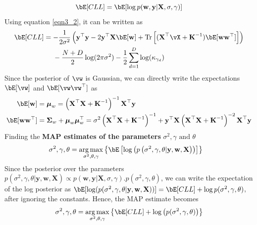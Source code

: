 \documentclass[a4paper,11pt]{article}
\begin{document}
\begin{pmisolution}
\begin{equation*}
    \bE[CLL] = \bE[\log p(\textbf{w}, \textbf{y}|\textbf{X}, \sigma, \gamma)]
\end{equation*}
Using equation \ref{eqn3_2}, it can be written as
\begin{equation}
\label{eqn3_3}
    \begin{split}
    \bE[CLL] &= -\frac{1}{2\sigma^2} \left(\textbf{y}^\top\textbf{y} - 2\textbf{y}^\top\textbf{X}\bE[\textbf{w}] + \text{Tr}\left[(\textbf{X}^\top\vX +\textbf{K}^{-1})\bE[\textbf{ww}^\top]\right] \right) 
    \\& ~~~~ - \frac{N+D}{2} \log (2\pi\sigma^2) - \frac{1}{2} \sum_{d=1}^D  \log (\kappa_{\gamma_d})
    \end{split}
\end{equation}
Since the posterior of $\vw$ is Gaussian, we can directly write the expectations $\bE[\vw]$ and $\bE[\vw\vw^\top]$ as
\begin{equation}
\label{eqn3_4}
\begin{split}
    \bE[\textbf{w}] &= \boldsymbol{\mu}_w = \left(\textbf{X}^\top\textbf{X} + \textbf{K}^{-1}\right) ^{-1}\textbf{X}^\top\textbf{y}
    \\ \bE[\textbf{ww}^\top] &= \boldsymbol{\Sigma}_w + \boldsymbol{\mu}_w\boldsymbol{\mu}_w^\top = \sigma^2\left(\textbf{X}^\top\textbf{X} + \textbf{K}^{-1}\right)^{-1} + \textbf{y}^\top\textbf{X}\left(\textbf{X}^\top\textbf{X} + \textbf{K}^{-1}\right)^{-2}\textbf{X}^\top\textbf{y} 
\end{split}
\end{equation}
\newpage
\noindent Finding the \textbf{MAP estimates of the parameters} $\sigma^2, \gamma \text{ and } \theta$
\begin{align}
    \sigma^2, \gamma, \theta &= \argmax_{\sigma^2, \theta, \gamma} \left\{ \bE\left[\log \left(p\left(\sigma^2, \gamma, \theta|\textbf{y}, \textbf{w}, \textbf{X}\right)\right)\right] \right\}
    \nonumber
\end{align}
Since the posterior over the parameters $p(\sigma^2, \gamma, \theta|\textbf{y}, \textbf{w}, \textbf{X}) \propto p(\textbf{w}, \textbf{y}|\textbf{X}, \sigma, \gamma).p(\sigma^2, \gamma, \theta)$, we can write the expectation of the log posterior as $\bE[\log (p(\sigma^2, \gamma, \theta|\textbf{y}, \textbf{w}, \textbf{X}))] = \bE[CLL] + \log p(\sigma^2, \gamma, \theta)$, after ignoring the constants. Hence, the MAP estimate becomes
\begin{equation}
\label{eqn3_5}
    \sigma^2, \gamma, \theta = \argmax_{\sigma^2, \theta, \gamma}\left\{\bE[CLL] + \log \left(p(\sigma^2, \gamma, \theta)\right)\right\}

\end{equation}
\end{pmisolution}
\end{document}
